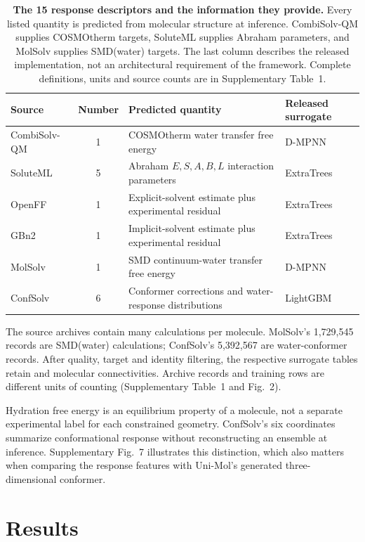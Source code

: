 \documentclass[12pt]{article}
\begin{document}
\begin{table}[!ht]
\centering\small
\caption{\textbf{The 15 response descriptors and the information they provide.}
Every listed quantity is predicted from molecular structure at inference.
CombiSolv-QM supplies COSMOtherm targets, SoluteML supplies Abraham parameters, and
MolSolv supplies SMD(water) targets.
The last column describes the released implementation, not an architectural
requirement of the framework. Complete definitions, units and source counts are
in Supplementary Table~1.}
\label{tab:sources}
\begin{tabularx}{\textwidth}{@{}l c X l@{}}
\toprule
Source & Number & Predicted quantity & Released surrogate \\
\midrule
CombiSolv-QM & 1 & COSMOtherm water transfer free energy & D-MPNN \\
SoluteML & 5 & Abraham $E,S,A,B,L$ interaction parameters & ExtraTrees \\
OpenFF & 1 & Explicit-solvent estimate plus experimental residual & ExtraTrees \\
GBn2 & 1 & Implicit-solvent estimate plus experimental residual & ExtraTrees \\
MolSolv & 1 & SMD continuum-water transfer free energy & D-MPNN \\
ConfSolv & 6 & Conformer corrections and water-response distributions & LightGBM \\
\bottomrule
\end{tabularx}
\end{table}

The source archives contain many calculations per molecule. MolSolv's
1,729,545 records are SMD(water) calculations; ConfSolv's 5,392,567 are
water-conformer records. After quality, target and identity filtering, the
respective surrogate tables retain \MolSolvN{} and \ConfSolvN{} molecular
connectivities. Archive records and training rows are different
units of counting (Supplementary Table~1 and Fig.~2).\cite{molsolv2022}

Hydration free energy is an equilibrium property of a molecule, not a separate
experimental label for each constrained geometry. ConfSolv's six coordinates
summarize conformational response without reconstructing an ensemble at
inference. Supplementary Fig.~7 illustrates this distinction, which also matters
when comparing the response features with Uni-Mol's generated three-dimensional
conformer.\cite{unimol2023}

\FloatBarrier
\section*{Results}
\end{document}
